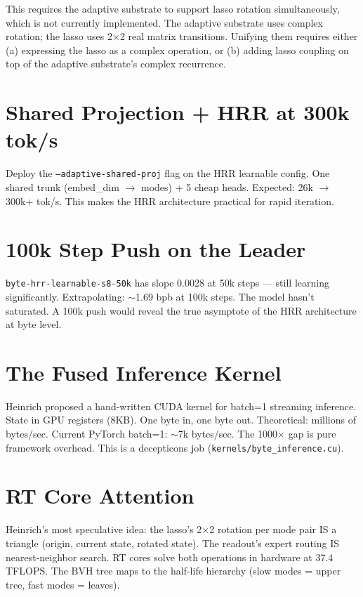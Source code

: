 \documentclass[11pt,a4paper]{report}
\begin{document}
This requires the adaptive substrate to support lasso rotation simultaneously, which is not currently implemented. The adaptive substrate uses complex rotation; the lasso uses 2$\times$2 real matrix transitions. Unifying them requires either (a) expressing the lasso as a complex operation, or (b) adding lasso coupling on top of the adaptive substrate's complex recurrence.

\section{Shared Projection + HRR at 300k tok/s}

Deploy the \texttt{--adaptive-shared-proj} flag on the HRR learnable config. One shared trunk (embed\_dim $\to$ modes) + 5 cheap heads. Expected: 26k $\to$ 300k+ tok/s. This makes the HRR architecture practical for rapid iteration.

\section{100k Step Push on the Leader}

\texttt{byte-hrr-learnable-s8-50k} has slope 0.0028 at 50k steps --- still learning significantly. Extrapolating: $\sim$1.69 bpb at 100k steps. The model hasn't saturated. A 100k push would reveal the true asymptote of the HRR architecture at byte level.

\section{The Fused Inference Kernel}

Heinrich proposed a hand-written CUDA kernel for batch=1 streaming inference. State in GPU registers (8KB). One byte in, one byte out. Theoretical: millions of bytes/sec. Current PyTorch batch=1: $\sim$7k bytes/sec. The 1000$\times$ gap is pure framework overhead. This is a decepticons job (\texttt{kernels/byte\_inference.cu}).

\section{RT Core Attention}

Heinrich's most speculative idea: the lasso's 2$\times$2 rotation per mode pair IS a triangle (origin, current state, rotated state). The readout's expert routing IS nearest-neighbor search. RT cores solve both operations in hardware at 37.4 TFLOPS. The BVH tree maps to the half-life hierarchy (slow modes = upper tree, fast modes = leaves).
\end{document}
